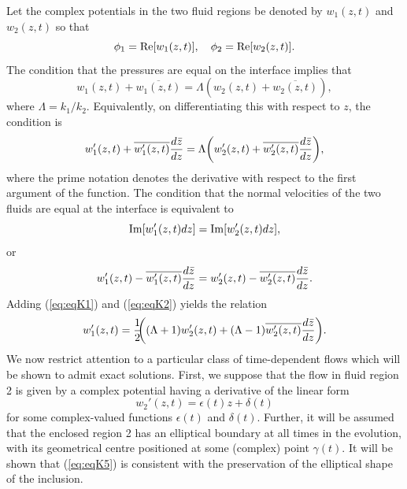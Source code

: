 \documentclass[fleqn]{jleo}
\begin{document}
Let the complex potentials in the two fluid regions be denoted
by $w_1(z,t)$ and $w_2(z,t)$ so that
\begin{equation}
\phi_1 = {\rm Re}[w_1(z,t)],\quad \phi_2 = {\rm Re}[w_2(z,t)].
\end{equation}
The condition that the pressures are equal on the interface implies
that
\begin{equation}
w_1(z,t) + \overline{w_1(z,t)} = \Lambda {\left(w_2(z,t) + \overline{w_2(z,t)}\right)},
\end{equation}
where $\Lambda =k_1/k_2$. Equivalently,
on differentiating this with respect to $z$, the condition is
\begin{equation}
w_1'(z,t) + \overline{w_1'(z,t)} {d \bar{z} \over dz} = \Lambda {\left(w_2'(z,t) + \overline{w_2'(z,t)}{d \bar{z} \over dz}
\right )},\label{eq:eqK1}
\end{equation}
where the prime notation denotes the derivative with respect to
the first argument of the function. The condition that the normal velocities of the two fluids are equal at the interface is equivalent to
\begin{equation}
{\rm Im}[w_1'(z,t) dz] = {\rm Im}[w_2'(z,t) dz],
\end{equation} 
or
\begin{equation}
w_1'(z,t) - \overline{w_1'(z,t)} {d \bar{z} \over dz} = 
w_2'(z,t) - \overline{w_2'(z,t)}{d \bar{z} \over dz}.
\label{eq:eqK2}
\end{equation}
Adding (\ref{eq:eqK1}) and (\ref{eq:eqK2}) yields the relation
\begin{equation}
w_1'(z,t) = {1 \over 2}\!\!{\left((\Lambda+1) w_2'(z,t) + (\Lambda-1) \overline{w_2'(z,t)} {d \bar{z} \over dz}\right)}.\label{eq:eqK6}
\end{equation}
We now restrict attention to 
a particular class of time-dependent flows which will
be shown to admit exact solutions. First, we
suppose that the flow in fluid region 2 is given by a complex
potential having a derivative of the linear form
\begin{equation}
w_2'(z,t) = \epsilon(t) z + \delta(t)\label{eq:eqK5}
\end{equation}
for some complex-valued functions $\epsilon(t)$ and $\delta(t)$. Further,
it will be assumed that the enclosed region 2 has an elliptical boundary
at all times in the evolution, with its geometrical centre positioned at
some (complex) point $\gamma(t)$. It will be shown that (\ref{eq:eqK5}) is
consistent with the preservation of the elliptical shape of the inclusion.
\end{document}
